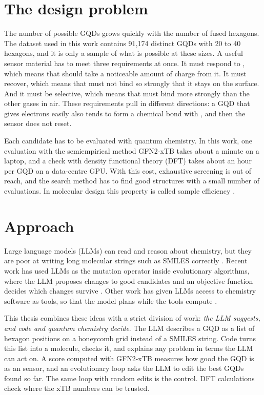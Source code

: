 \section{The design problem}

The number of possible GQDs grows quickly with the number of fused hexagons. The dataset used
in this work contains 91{,}174 distinct GQDs with 20 to 40 hexagons, and it is only a sample of
what is possible at these sizes. A useful sensor material has to meet three requirements at once.
It must respond to , which means that  should take a noticeable amount of charge
from it. It must recover, which means that  must not bind so strongly that it stays on the
surface. And it must be selective, which means that  must bind more strongly than the other
gases in air. These requirements pull in different directions: a GQD that gives electrons easily
also tends to form a chemical bond with , and then the sensor does not reset.

Each candidate has to be evaluated with quantum chemistry. In this work, one evaluation with the
semiempirical method GFN2-xTB \cite{bannwarth2019gfn2} takes about a minute on a laptop, and a
check with density functional theory (DFT) takes about an hour per GQD on a data-centre GPU. With
this cost, exhaustive screening is out of reach, and the search method has to find good structures
with a small number of evaluations. In molecular design this property is called sample efficiency
\cite{gao2022pmo}.

\section{Approach}

Large language models (LLMs) can read and reason about chemistry, but they are poor at writing
long molecular strings such as SMILES correctly \cite{guo2023llmchem}. Recent work has used LLMs as
the mutation operator inside evolutionary algorithms, where the LLM proposes changes to good
candidates and an objective function decides which changes survive
\cite{lehman2022elm,romeraparedes2024funsearch,wang2024molleo}. Other work has given LLMs access
to chemistry software as tools, so that the model plans while the tools compute
\cite{yao2023react,bran2024chemcrow,boiko2023coscientist}.

This thesis combines these ideas with a strict division of work: \emph{the LLM suggests, and code
and quantum chemistry decide}. The LLM describes a GQD as a list of hexagon positions on a
honeycomb grid instead of a SMILES string. Code turns this list into a molecule, checks it, and
explains any problem in terms the LLM can act on. A score computed with GFN2-xTB measures how good
the GQD is as an  sensor, and an evolutionary loop asks the LLM to edit the best GQDs found
so far. The same loop with random edits is the control. DFT calculations check where the
xTB numbers can be trusted.


